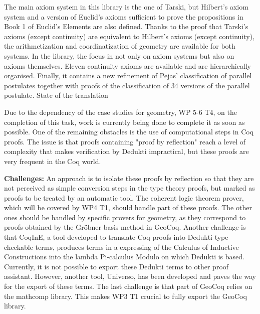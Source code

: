 \begin{workpackage}[id=libraries,wphases=0-48,type=RTD,
  short=Libraries,%
  title=Libraries,
  lead=Inr,
  InrRM=10,
  TumRM=39]
\begin{tasklist}
\begin{task}[id=geocoq,title=The GeoCoq library]
The main axiom system in this library is the one of Tarski, but Hilbert's axiom system and a version of Euclid's axioms sufficient to prove the propositions in Book 1 of Euclid's Elements are also defined. Thanks to the proof that Tarski's axioms (except continuity) are equivalent to Hilbert's axioms (except continuity), the arithmetization and coordinatization of geometry are available for both systems. In the library, the focus in not only on axiom systems but also on axioms themselves. Eleven continuity axioms are available and are hierarchically organised. Finally, it contains a new refinement of Pejas' classification of parallel postulates together with proofs of the classification of 34 versions of the parallel postulate.
State of the translation

Due to the dependency of the case studies for geometry, WP 5-6 T4, on the completion of this task, work is currently being done to complete it as soon as possible. One of the remaining obstacles is the use of computational steps in Coq proofs. The issue is that proofs containing "proof by reflection" reach a level of complexity that makes verification by Dedukti impractical, but these proofs are very frequent in the Coq world.

\textbf{Challenges:}
An approach is to isolate these proofs by reflection so that they are not perceived as simple conversion steps in the type theory proofs, but marked as proofs to be treated by an automatic tool. The coherent logic theorem prover, which will be covered by WP4 T1, should handle part of these proofs. The other ones should be handled by specific provers for geometry, as they correspond to proofs obtained by the Gr\"obner basis method in GeoCoq.
Another challenge is that CoqInE, a tool developed to translate Coq proofs into Dedukti type-checkable terms, produces terms in a expressing of the Calculus of Inductive Constructions into the lambda Pi-calculus Modulo on which Dedukti is based. Currently, it is not possible to export these Dedukti terms to other proof assistant. However, another tool, Universo, has been developed and paves the way for the export of these terms.
The last challenge is that part of GeoCoq relies on the mathcomp library. This makes WP3 T1 crucial to fully export the GeoCoq library.


\end{task}
\end{tasklist}
\end{workpackage}

